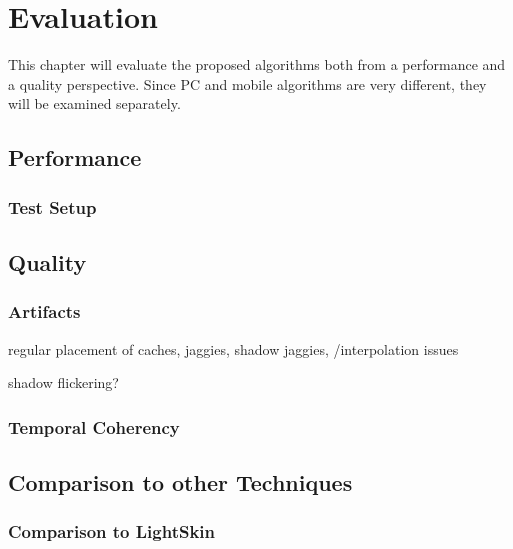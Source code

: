 \documentclass[thesis.tex]{subfiles}
\begin{document}
\chapter{Evaluation}\label{chap:eva}
This chapter will evaluate the proposed algorithms both from a performance and a quality perspective. Since PC and mobile algorithms are very different, they will be examined separately.

\section{Performance}

\subsection{Test Setup}

\newpage

\section{Quality}

\subsection{Artifacts}

regular placement of caches, jaggies,
shadow jaggies,
/interpolation issues

shadow flickering?


\subsection{Temporal Coherency}


\section{Comparison to other Techniques}

\subsection{Comparison to LightSkin}

\subfilebib %
\end{document}
